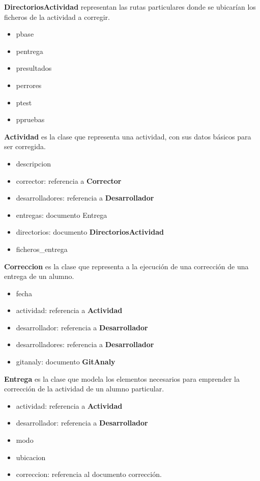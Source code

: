 \begin{description}
\item \textbf{DirectoriosActividad} representan las rutas particulares donde se ubicarían los ficheros de la actividad a corregir.
\begin{itemize}
\item pbase
\item pentrega
\item presultados
\item perrores
\item ptest
\item ppruebas
\end{itemize}
\item \textbf{Actividad} es la clase que representa una actividad, con sus datos básicos para ser corregida.
\begin{itemize}
\item descripcion
\item corrector: referencia a \textbf{Corrector}
\item desarrolladores: referencia a \textbf{Desarrollador}
\item entregas: documento Entrega
\item directorios: documento \textbf{DirectoriosActividad}
\item ficheros\_entrega
\end{itemize}
\item \textbf{Correccion} es la clase que representa a la ejecución de una corrección de una entrega de un alumno.
\begin{itemize}
\item fecha
\item actividad: referencia a \textbf{Actividad}
\item desarrollador: referencia a \textbf{Desarrollador}
\item desarrolladores: referencia a \textbf{Desarrollador}
\item gitanaly: documento \textbf{GitAnaly}
\end{itemize}
\item \textbf{Entrega} es la clase que modela los elementos necesarios para emprender la corrección de la actividad de un alumno particular.
\begin{itemize}
\item actividad: referencia a \textbf{Actividad}
\item desarrollador: referencia a \textbf{Desarrollador}
\item modo
\item ubicacion
\item correccion: referencia al documento corrección.

\end{itemize}
\end{description}
